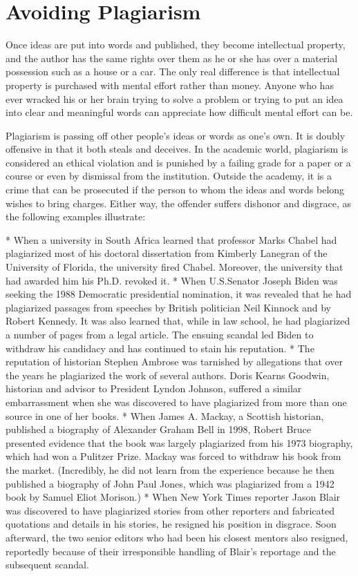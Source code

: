 \documentclass{book}
\begin{document}
\section{Avoiding Plagiarism}

Once ideas are put into words and published, they become intellectual property, and the author has the same rights over them as he or she has over a material possession such as a house or a car. The only real difference is that intellectual property is purchased with mental effort rather than money. Anyone who has ever wracked his or her brain trying to solve a problem or trying to put an idea into clear and meaningful words can appreciate how difficult mental effort can be.

Plagiarism is passing off other people’s ideas or words as one’s own. It is doubly offensive in that it both steals and deceives. In the academic world, plagiarism is considered an ethical violation and is punished by a failing grade for a paper or a course or even by dismissal from the institution. Outside the academy, it is a crime that can be prosecuted if the person to whom the ideas and words belong wishes to bring charges. Either way, the offender suffers dishonor and disgrace, as the following examples illustrate:

* When a university in South Africa learned that professor Marks Chabel had plagiarized most of his doctoral dissertation from Kimberly Lanegran of the University of Florida, the university fired Chabel. Moreover, the university that had awarded him his Ph.D. revoked it.
* When U.S.Senator Joseph Biden was seeking the 1988 Democratic presidential nomination, it was revealed that he had plagiarized passages from speeches by British politician Neil Kinnock and by Robert Kennedy. It was also learned that, while in law school, he had plagiarized a number of pages from a legal article. The ensuing scandal led Biden to withdraw his candidacy and has continued to stain his reputation.
*  The reputation of historian Stephen Ambrose was tarnished by allegations that over the years he plagiarized the work of several authors. Doris Kearns Goodwin, historian and advisor to President Lyndon Johnson, suffered a similar embarrassment when she was discovered to have plagiarized from more than one source in one of her books.
* When James A. Mackay, a Scottish historian, published a biography of Alexander Graham Bell in 1998, Robert Bruce presented evidence that the book was largely plagiarized from his 1973 biography, which had won a Pulitzer Prize. Mackay was forced to withdraw his book from the market. (Incredibly, he did not learn from the experience because he then published a biography of John Paul Jones, which was plagiarized from a 1942 book by Samuel Eliot Morison.)
* When New York Times reporter Jason Blair was discovered to have plagiarized stories from other reporters and fabricated quotations and details in his stories, he resigned his position in disgrace. Soon afterward, the two senior editors who had been his closest mentors also resigned, reportedly because of their irresponsible handling of Blair’s reportage and the subsequent scandal.
\end{document}

